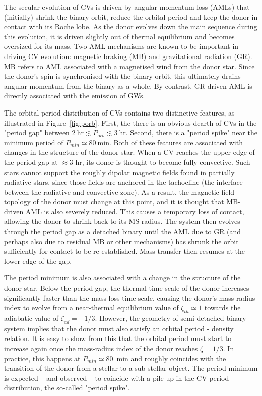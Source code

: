\documentclass[fleqn,usenatbib]{mnras}
\begin{document}
The secular evolution of CVs is driven by angular momentum loss (AMLs) that (initially) shrink the binary orbit, reduce the orbital period and keep the donor in contact with its Roche lobe. As the donor evolves down the main sequence during this evolution, it is driven slightly out of thermal equilibrium and becomes oversized for its mass. Two AML mechanisms are known to be important in driving CV evolution: magnetic braking (MB) and gravitational radiation (GR). MB refers to AML associated with a magnetised wind from the donor star. Since the donor's spin is synchronised with the binary orbit, this ultimately drains angular momentum from the binary as a whole. By contrast, GR-driven AML is directly associated with the emission of GWs.  

The orbital period distribution of CVs contains two distinctive features, as illustrated in Figure~\ref{fig:porb}. First, the there is an obvious dearth of CVs in the "period gap" between $2~\mathrm{hr} \lesssim P_{orb} \lesssim 3~\mathrm{hr}$. Second, there is a "period spike" near the minimum period of $P_{min} \simeq 80~\mathrm{min}$. Both of these features are associated with changes in the structure of the donor star. When a CV reaches the upper edge of the period gap at $\approx 3$ hr, its donor is thought to become fully convective. Such stars cannot support the roughly dipolar magnetic fields found in partially radiative stars, since those fields are anchored in the tachocline (the interface between the radiative and convective zone). As a result, the magnetic field topology of the donor must change at this point, and it is thought that MB-driven AML is also severely reduced. This causes a temporary loss of contact, allowing the donor to shrink back to its MS radius. The system then evolves through the period gap as a detached binary until the AML due to GR (and perhaps also due to residual MB or other mechanisms) has shrunk the orbit sufficiently for contact to be re-established. Mass transfer then resumes at the lower edge of the gap.

The period minimum is also associated with a change in the structure of the donor star. Below the period gap, the thermal time-scale of the donor increases significantly faster than the mass-loss time-scale, causing the donor's mass-radius index to evolve from a near-thermal equilibrium value of  $\zeta_{th} \simeq 1$ towards the adiabatic value of $\zeta_{ad} = -1/3$. However, the geometry of semi-detached binary system implies that the donor must also satisfy an orbital period - density relation. It is easy to show from this that the orbital period must start to increase again once the mass-radius index of the donor reaches $\zeta = 1/3$. In practice, this happens at $P_{min} \simeq 80$~min and roughly coincides with the transition of the donor from a stellar to a sub-stellar object. The period minimum is expected -- and observed -- to coincide with a pile-up in the CV period distribution, the so-called "period spike".
\end{document}
